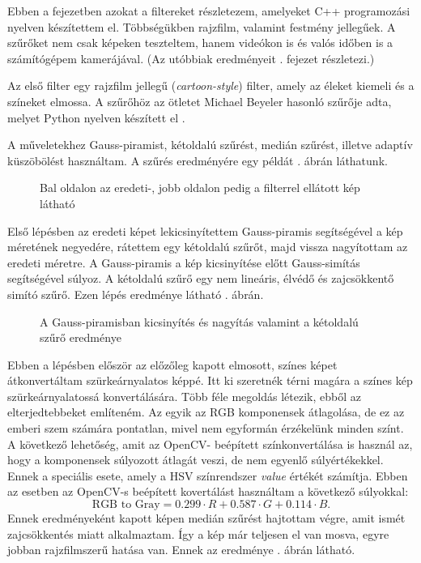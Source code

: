

Ebben a fejezetben azokat a filtereket részletezem, amelyeket C++ programozási nyelven készítettem el. Többségükben rajzfilm, valamint festmény jellegűek. A szűrőket nem csak képeken teszteltem, hanem videókon is és valós időben is a számítógépem kamerájával. (Az utóbbiak eredményeit . fejezet részletezi.)


Az első filter egy rajzfilm jellegű (\textit{cartoon-style}) filter, amely az éleket kiemeli és a színeket elmossa. A szűrőhöz az ötletet Michael Beyeler hasonló szűrője adta, melyet Python nyelven készített el \cite{beyeler}.

A műveletekhez Gauss-piramist, kétoldalú szűrést, medián szűrést, illetve adaptív küszöbölést használtam. A szűrés eredményére egy példát . ábrán láthatunk.

\begin{figure}[ht]
\centering
{}
\caption{Bal oldalon az eredeti-, jobb oldalon pedig a filterrel ellátott kép látható} 
\label{fig:cartoon1}
\end{figure}


Első lépésben az eredeti képet lekicsinyítettem Gauss-piramis segítségével a kép méretének negyedére, rátettem egy kétoldalú szűrőt, majd vissza nagyítottam az eredeti méretre. A Gauss-piramis a kép kicsinyítése előtt Gauss-simítás segítségével súlyoz. A kétoldalú szűrő egy nem lineáris, élvédő és zajcsökkentő simító szűrő. Ezen lépés eredménye látható . ábrán.

\begin{figure}[ht]
\centering
{}
\caption{A Gauss-piramisban kicsinyítés és nagyítás valamint a kétoldalú szűrő eredménye } 
\label{fig:cartoon2}
\end{figure}


Ebben a lépésben először az előzőleg kapott elmosott, színes képet átkonvertáltam szürkeárnyalatos képpé. 
Itt ki szeretnék térni magára a színes kép szürkeárnyalatossá konvertálására. Több féle megoldás létezik, ebből az elterjedtebbeket említeném. Az egyik az RGB komponensek átlagolása, de ez az emberi szem számára pontatlan, mivel nem egyformán érzékelünk minden színt. A következő lehetőség, amit az OpenCV- beépített színkonvertálása is használ az, hogy a komponensek súlyozott átlagát veszi, de nem egyenlő súlyértékekkel. Ennek a speciális esete, amely a HSV színrendszer \textit{value} értékét számítja. Ebben az esetben az OpenCV-s beépített kovertálást használtam a következő súlyokkal:
$$
\text{RGB to Gray} = 0.299 \cdot R+0.587 \cdot G + 0.114 \cdot B.
$$ 
Ennek eredményeként kapott képen medián szűrést hajtottam végre, amit ismét zajcsökkentés miatt alkalmaztam. Így a kép már teljesen el van mosva, egyre jobban rajzfilmszerű hatása van. Ennek az eredménye . ábrán látható.

